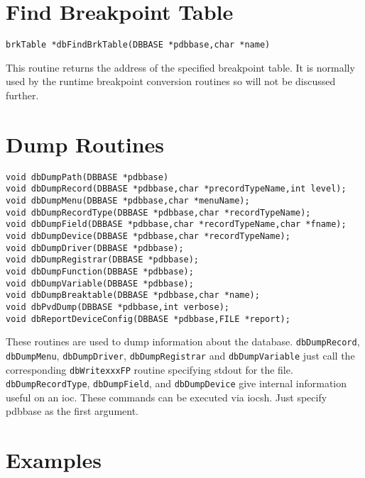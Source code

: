 \section{Find Breakpoint Table}

\begin{verbatim}
brkTable *dbFindBrkTable(DBBASE *pdbbase,char *name)
\end{verbatim}

This routine returns the address of the specified breakpoint table. It is normally used by the runtime breakpoint conversion 
routines so will not be discussed further.

\section{Dump Routines}

\begin{verbatim}
void dbDumpPath(DBBASE *pdbbase)
void dbDumpRecord(DBBASE *pdbbase,char *precordTypeName,int level);
void dbDumpMenu(DBBASE *pdbbase,char *menuName);
void dbDumpRecordType(DBBASE *pdbbase,char *recordTypeName);
void dbDumpField(DBBASE *pdbbase,char *recordTypeName,char *fname);
void dbDumpDevice(DBBASE *pdbbase,char *recordTypeName);
void dbDumpDriver(DBBASE *pdbbase);
void dbDumpRegistrar(DBBASE *pdbbase);
void dbDumpFunction(DBBASE *pdbbase);
void dbDumpVariable(DBBASE *pdbbase);
void dbDumpBreaktable(DBBASE *pdbbase,char *name);
void dbPvdDump(DBBASE *pdbbase,int verbose);
void dbReportDeviceConfig(DBBASE *pdbbase,FILE *report);
\end{verbatim}

These routines are used to dump information about the database. \verb|dbDumpRecord|, \verb|dbDumpMenu|, \verb|dbDumpDriver|, \verb|dbDumpRegistrar| and \verb|dbDumpVariable| just call the corresponding \verb|dbWritexxxFP| routine specifying stdout for 
the file. \verb|dbDumpRecordType|, \verb|dbDumpField|, and \verb|dbDumpDevice| give internal information useful on an ioc. 
These commands can be executed via iocsh. Just specify pdbbase as the first argument.

\section{Examples}

